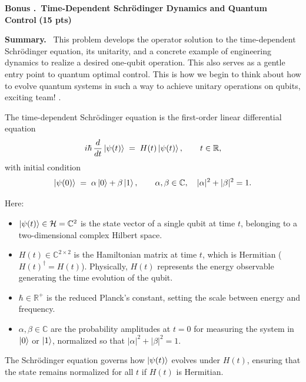 \documentclass[11pt]{article}
\newcommand{\pts}[1]{\hfill{\small\bfseries(#1 pts)}}
\newenvironment{summary}{\vspace{2pt}\noindent\textbf{Summary.}~}{\par\vspace{6pt}}
\newcounter{problem}
\newcounter{bonus}
\newcommand{\bonus}[2]{%
  \refstepcounter{bonus}
  \vspace{10pt}\noindent\textbf{Bonus \Alph{bonus}.~#1} \pts{#2}\par
}
\begin{document}
\bonus{Time-Dependent Schr\"odinger Dynamics and Quantum Control}{15}
\begin{summary}
This problem develops the operator solution to the time-dependent Schr\"odinger equation, its unitarity, and a concrete example of engineering dynamics to realize a desired one-qubit operation. This also serves as a gentle entry point to quantum optimal control. This is how we begin to think about how to evolve quantum systems in such a way to achieve unitary operations on qubits, exciting team! \smiley{}.

The time-dependent Schr\"odinger equation is the first-order linear differential equation
\[
i\hbar \,\frac{d}{dt}\ket{\psi(t)} \;=\; H(t)\ket{\psi(t)}, 
\qquad t \in \mathbb{R},
\]
with initial condition
\[
\ket{\psi(0)} \;=\; \alpha \ket{0} + \beta \ket{1}, 
\qquad \alpha, \beta \in \mathbb{C}, \quad |\alpha|^2 + |\beta|^2 = 1.
\]

Here:
\begin{itemize}
  \item $\ket{\psi(t)} \in \mathcal{H} = \mathbb{C}^2$ is the state vector of a single qubit at time $t$, belonging to a two-dimensional complex Hilbert space.
  \item $H(t) \in \mathbb{C}^{2\times 2}$ is the Hamiltonian matrix at time $t$, which is Hermitian ($H(t)^\dagger = H(t)$). Physically, $H(t)$ represents the energy observable generating the time evolution of the qubit.
  \item $\hbar \in \mathbb{R}^+$ is the reduced Planck’s constant, setting the scale between energy and frequency.
  \item $\alpha, \beta \in \mathbb{C}$ are the probability amplitudes at $t=0$ for measuring the system in $\ket{0}$ or $\ket{1}$, normalized so that $|\alpha|^2 + |\beta|^2 = 1$.
\end{itemize}

The Schr\"odinger equation governs how $\ket{\psi(t)}$ evolves under $H(t)$, ensuring that the state remains normalized for all $t$ if $H(t)$ is Hermitian.

\end{summary}
\end{document}
